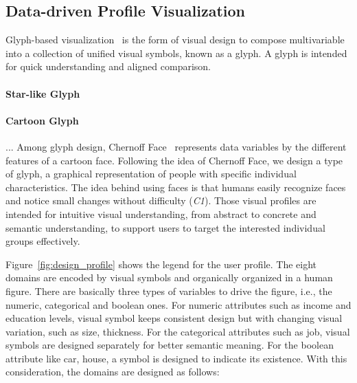 

\subsection{Data-driven Profile Visualization}

Glyph-based visualization~\cite{borgo2013glyph} is the form of visual design to compose multivariable into a collection of unified visual symbols, known as a glyph. A glyph is intended for quick understanding and aligned comparison. 

\paragraph{Star-like Glyph} 

\paragraph{Cartoon Glyph} ... Among glyph design, Chernoff Face~\cite{chernoff1973use} represents data variables by the different features of a cartoon face. Following the idea of Chernoff Face, we design a type of glyph, a graphical representation of people with specific individual characteristics. The idea behind using faces is that humans easily recognize faces and notice small changes without difficulty (\textit{C1}). Those visual profiles are intended for intuitive visual understanding, from abstract to concrete and semantic understanding, to support users to target the interested individual groups effectively.

Figure~\ref{fig:design_profile} shows the legend for the user profile. The eight domains are encoded by visual symbols and organically organized in a human figure. There are basically three types of variables to drive the figure, i.e., the numeric, categorical and boolean ones. For numeric attributes such as income and education levels, visual symbol keeps consistent design but with changing visual variation, such as size, thickness. For the categorical attributes such as job, visual symbols are designed separately for better semantic meaning. For the boolean attribute like car, house, a symbol is designed to indicate its existence. With this consideration, the domains are designed as follows:

